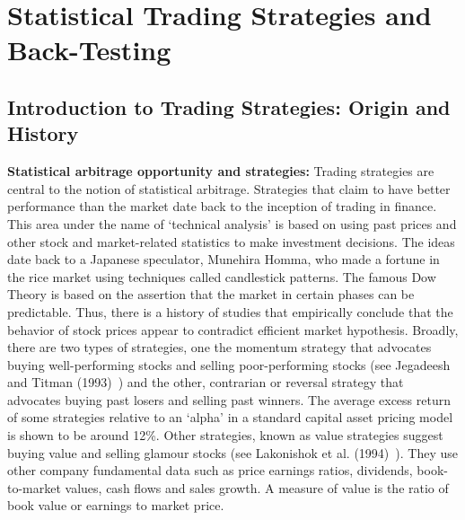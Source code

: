 \chapter{Statistical Trading Strategies and Back-Testing \label{ch:stat_ts}}
\section{Introduction to Trading Strategies: Origin and History}

\noindent\textbf{Statistical arbitrage opportunity and strategies:} Trading strategies are central to the notion of statistical arbitrage. Strategies that claim to have better performance than the market date back to the inception of trading in finance. This area under the name of `technical analysis' is based on using past prices and other stock and market-related statistics to make investment decisions. The ideas date back to a Japanese speculator, Munehira Homma, who made a fortune in the rice market using techniques called candlestick patterns. The famous Dow Theory is based on the assertion that the market in certain phases can be predictable. Thus, there is a history of studies that empirically conclude that the behavior of stock prices appear to contradict efficient market hypothesis. Broadly, there are two types of strategies, one the momentum strategy that  advocates buying well-performing stocks and selling poor-performing stocks (see Jegadeesh and Titman (1993)~\cite{JeTit}) and the other, contrarian or reversal strategy that advocates buying past losers and selling past winners. The average excess return of some strategies relative to an `alpha' in a standard capital asset pricing model is shown to be around 12\%. Other strategies, known as value strategies suggest buying value and selling glamour stocks (see Lakonishok et al. (1994)~\cite{Lako}). They use other company fundamental data such as price earnings ratios, dividends, book-to-market values, cash flows and sales growth. A measure of value is the ratio of book value or earnings to market price.


